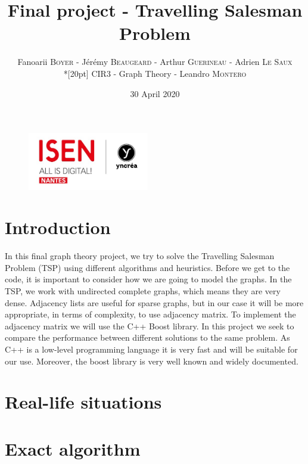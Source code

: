 \documentclass[a4paper, 12pt]{report}
\title{Final project - Travelling Salesman Problem}
\author{Fanoarii \textsc{Boyer} - Jérémy \textsc{Beaugeard} - Arthur \textsc{Guerineau} - Adrien \textsc{Le Saux} \\*[20pt] CIR3 - Graph Theory - Leandro \textsc{Montero}}
\date{30 April 2020}
\begin{document}
	\begin{titlepage}
		\begin{figure}
			\begin{center}
				\includegraphics[width=150pt]{isen.png}
				\maketitle
			\end{center}
		\end{figure}
	\end{titlepage}

	\tableofcontents
	
	\chapter{Introduction}
	\BlankLine
	In this final graph theory project, we try to solve the Travelling Salesman Problem (TSP) using different algorithms and heuristics.
	Before we get to the code, it is important to consider how we are going to model the graphs.
	\BlankLine
	In the TSP, we work with undirected complete graphs, which means they are very dense. Adjacency lists are useful for sparse graphs, but in our case it will be more appropriate, in terms of complexity, to use adjacency matrix.
	\BlankLine
	To implement the adjacency matrix we will use the C++ Boost library. In this project we seek to compare the performance between different solutions to the same problem. As C++ is a low-level programming language it is very fast and will be suitable for our use. Moreover, the boost library is very well known and widely documented.
	
	\chapter{Real-life situations}
	
	\chapter{Exact algorithm}
\end{document}
